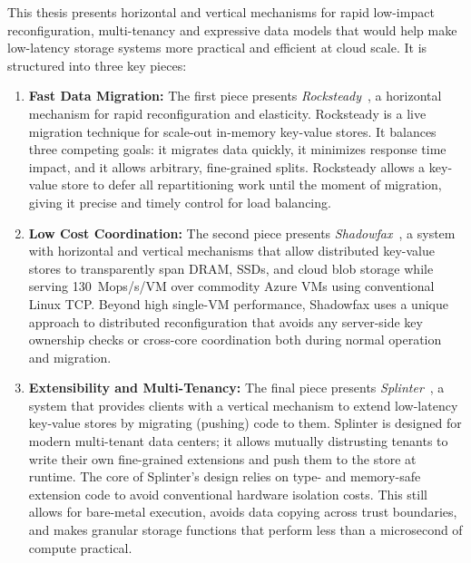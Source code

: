 \vspace{8pt}

This thesis presents horizontal and vertical mechanisms for
rapid low-impact reconfiguration, multi-tenancy and expressive data
models that
would help make low-latency storage systems more practical and
efficient at cloud scale.
%
It is structured into three key pieces:

\begin{enumerate}
\item \textbf{Fast Data Migration:}
The first piece presents \emph{Rocksteady}~\cite{rocksteady},
a horizontal mechanism for rapid reconfiguration and elasticity.
%
Rocksteady is a live migration technique for scale-out
in-memory key-value stores.
%
It balances three competing goals: it
migrates data quickly, it minimizes response time impact, and it
allows arbitrary, fine-grained splits.
%
Rocksteady allows a key-value store to defer all repartitioning work
until the moment of migration, giving it precise and timely control for
load balancing.

\item \textbf{Low Cost Coordination:}
The second piece presents \emph{Shadowfax}~\cite{shadowfax},
a system with horizontal and vertical mechanisms that
allow distributed key-value stores to
transparently span DRAM, SSDs, and cloud blob storage while serving
130~Mops/s/VM over commodity Azure VMs using conventional Linux TCP.
%
Beyond
high single-VM performance, Shadowfax uses a unique approach to distributed
reconfiguration that avoids any server-side key ownership checks
or cross-core coordination both during normal operation and migration.

\item \textbf{Extensibility and Multi-Tenancy:}
The final piece presents \emph{Splinter}~\cite{splinter}, a system that
provides clients with a vertical mechanism
to extend low-latency key-value stores by migrating (pushing) code to them.
%
Splinter is designed for
modern multi-tenant data centers; it allows mutually distrusting tenants to write
their own fine-grained extensions and push
them to the store at runtime.
%
The core of
Splinter's design relies on type- and memory-safe
extension code to avoid conventional hardware isolation costs.
%
This
still allows for bare-metal execution, avoids data copying across trust
boundaries, and makes granular storage functions that perform less than
a microsecond of compute practical.

\end{enumerate}

